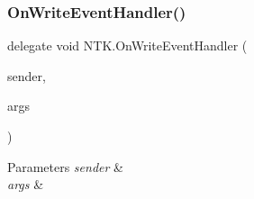 \subsubsection{\texorpdfstring{OnWriteEventHandler()}{OnWriteEventHandler()}}
{\footnotesize\ttfamily delegate void N\+T\+K.\+On\+Write\+Event\+Handler (\begin{DoxyParamCaption}\item[{object}]{sender,  }\item[{\mbox{\hyperlink{class_n_t_k_1_1_events_args_1_1_msg_args}{Msg\+Args}}}]{args }\end{DoxyParamCaption})}






\begin{DoxyParams}{Parameters}
{\em sender} & \\
\hline
{\em args} & \\
\hline
\end{DoxyParams}
